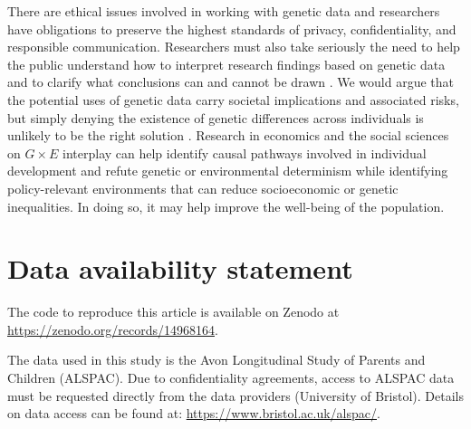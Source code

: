 \documentclass[12pt,a4paper]{article}
\begin{document}
\begin{bibunit}
There are ethical issues involved in working with genetic data and researchers have obligations to preserve the highest standards of privacy, confidentiality, and responsible communication. Researchers must also take seriously the need to help the public understand how to interpret research findings based on genetic data and to clarify what conclusions can and cannot be drawn \citep{dangerouswork}. We would argue that the potential uses of genetic data carry societal implications and associated risks, but simply denying the existence of genetic differences across individuals is unlikely to be the right solution \citep{raffington2020polygenic,Harden2021}. Research in economics and the social sciences on $G \times E$ interplay can help identify causal pathways involved in individual development and refute genetic or environmental determinism while identifying policy-relevant environments that can reduce socioeconomic or genetic inequalities. In doing so, it may help improve the well-being of the population. 

\section{Data availability statement} \label{sec:dataavailability}
The code to reproduce this article is available on Zenodo at \url{https://zenodo.org/records/14968164}.

The data used in this study is the Avon Longitudinal Study of Parents and Children (ALSPAC). Due to confidentiality agreements, access to ALSPAC data must be requested directly from the data providers (University of Bristol). Details on data access can be found at: \url{https://www.bristol.ac.uk/alspac/}.

\newpage
\begin{spacing}{1.0}
\setlength{\bibsep}{0.0pt}
\putbib[genes]
\end{spacing}
\end{bibunit}

\clearpage
\end{document}
